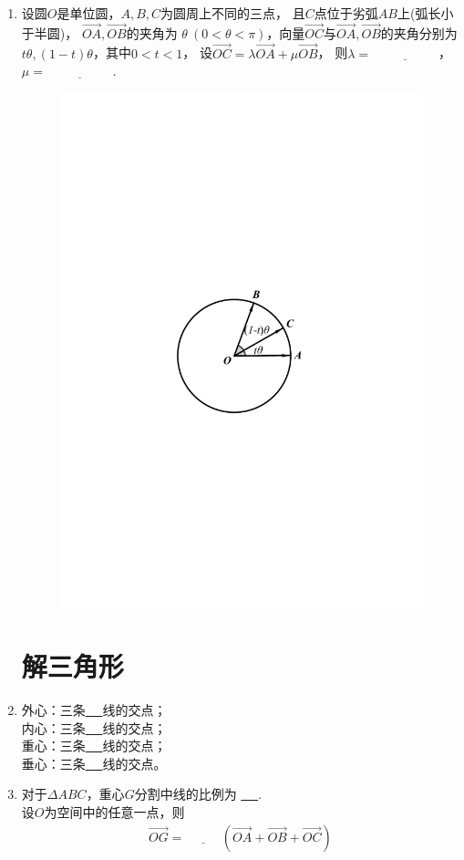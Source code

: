 \documentclass{article}
\newif\ifte
\renewcommand{\vec}{\overrightarrow}
\begin{document}
\begin{multicols}{2}
\begin{enumerate}[leftmargin=20pt]
\item 设圆$ O $是单位圆，$ A,B,C $为圆周上不同的三点，
且$ C $点位于劣弧$ AB $上(弧长小于半圆)，
$ \vec{OA},\vec{OB} $的夹角为
$ \theta\ (0<\theta<\pi) $，向量$\vec{OC}$与$ \vec{OA},
\vec{OB} $的夹角分别为$ t\theta,(1-t)\theta $，其中$ 0<t<1 $，
设$ \vec{OC}=\lambda\vec{OA}+\mu\vec{OB} $，
则$ \lambda=\underline{\ \ifte \dfrac{\sin((1-t)\theta)}{\sin(\theta)}
    \else \hspace{2cm} \fi\ } $，
$ \mu=\underline{\ \ifte \dfrac{\sin(t\theta)}{\sin(\theta)}
    \else \hspace{2cm} \fi\ } $.
\begin{figure}[H]
    \centering
    \includegraphics[width=0.4\linewidth]{单位圆上3个向量v1v2合成v四元数背景}
\end{figure} 

\section{解三角形}
\item 外心：三条\underline{\ \ifte 中垂\else \hspace{1.5cm} \fi\ }线的交点；\\
内心：三条\underline{\ \ifte 角平分\else \hspace{1.5cm} \fi\ }线的交点；\\
重心：三条\underline{\ \ifte 中\else \hspace{1.5cm} \fi\ }线的交点；\\
垂心：三条\underline{\ \ifte 垂\else \hspace{1.5cm} \fi\ }线的交点。

\item 对于$ \Delta ABC $，重心$ G $分割中线的比例为
\underline{\ \ifte 1:2\else \hspace{1cm} \fi\ }. \\
设$ O $为空间中的任意一点，则
\begin{align*}
    \vec{OG}=\underline{\ \ifte \dfrac{1}{3}
    \else \hspace{1cm} \fi\ } (\vec{OA}+\vec{OB}+\vec{OC})
\end{align*}


\end{enumerate}
\end{multicols}
\end{document}
